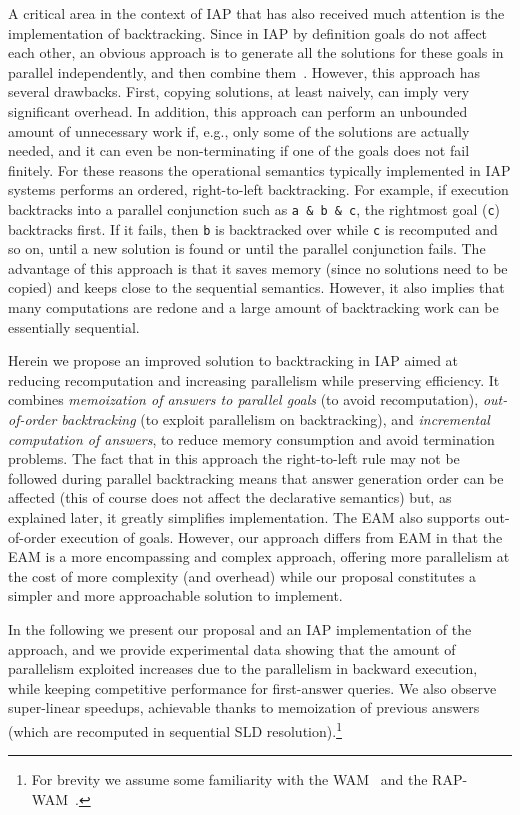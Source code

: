 \documentclass{tlp}
\begin{document}
A critical area in the context of IAP that has also received much
attention is the implementation of backtracking.  Since in IAP by
definition goals do not affect each other, an obvious approach is to
generate all the solutions for these goals in parallel independently,
and then combine them~\cite{Conery-Book-Short}.  However, this
approach has several drawbacks.  First, copying solutions, at least
naively, can imply very significant overhead.  In addition, this
approach can perform an unbounded amount of unnecessary work if, e.g.,
only some of the solutions are actually needed, and it can even be
non-terminating if one of the goals does not fail finitely.
For these reasons the operational semantics typically implemented in
IAP systems performs an ordered, right-to-left backtracking. For
example, if execution backtracks into a parallel conjunction such as
\lstinline{a & b & c}, 
the rightmost goal (\lstinline{c}) backtracks first. If it fails, then
\lstinline{b} is backtracked over while \lstinline{c} is recomputed
and so on, until a new solution is found or until the parallel
conjunction fails. The advantage of this approach is that it saves memory (since no
solutions need to be copied) and keeps close to the sequential
semantics. However, it also implies that many computations are redone
and a large amount of backtracking work can be essentially sequential.




Herein we propose an improved solution to backtracking in IAP aimed at
reducing recomputation and increasing parallelism while preserving
efficiency.  It combines \emph{memoization of answers to parallel
  goals} (to avoid recomputation), \emph{out-of-order backtracking}
(to exploit parallelism on backtracking), and \emph{incremental
  computation of answers}, to reduce memory consumption and avoid
termination problems. The fact that in this approach the right-to-left
rule may not be followed during parallel backtracking means that
answer generation order can be affected (this of course does not
affect the declarative semantics) but, as explained later, it greatly 
simplifies implementation.
The EAM also supports out-of-order execution of goals. 
However, our approach differs from EAM in 
that the EAM is a more encompassing and complex approach, offering
more parallelism at the cost of more complexity (and overhead) while
our proposal constitutes a simpler and more approachable solution to
implement.

In the following we present our proposal and an IAP implementation of
the approach, and we provide experimental data showing that the amount
of parallelism exploited increases due to the parallelism in backward
execution, while keeping competitive performance for first-answer
queries.  We also observe super-linear speedups, achievable thanks to
memoization of previous answers (which are recomputed in sequential
SLD resolution).\footnote{For brevity we assume some familiarity with
  the WAM~\cite{Warren83,hassan-wamtutorial} and the
  RAP-WAM~\cite{ngc-and-prolog}.}
\end{document}
